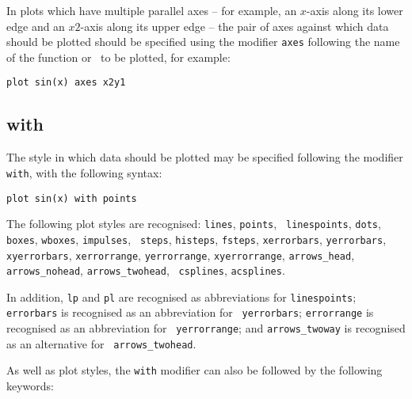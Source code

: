 In plots which have multiple parallel axes -- for example, an $x$-axis along its
lower edge and an $x2$-axis along its upper edge -- the pair of axes against
which data should be plotted should be specified using the modifier {\tt axes}
following the name of the function or \datafile\ to be plotted, for example:

\begin{verbatim}
plot sin(x) axes x2y1
\end{verbatim}

\subsection{with}

The style in which data should be plotted may be specified following the
modifier {\tt with}, with the following syntax:

\begin{verbatim}
plot sin(x) with points
\end{verbatim}

\label{sec:list_of_plotstyles}
The following plot styles are recognised: {\tt lines}, {\tt points}, {\tt
linespoints}, {\tt dots}, {\tt boxes}, {\tt wboxes}, {\tt impulses}, {\tt
steps}, {\tt histeps}, {\tt fsteps}, {\tt xerrorbars}, {\tt yerrorbars}, {\tt
xyerrorbars}, {\tt xerrorrange}, {\tt yerrorrange}, {\tt xyerrorrange},
\newline\noindent %
{\tt arrows\_head}, {\tt arrows\_nohead}, {\tt arrows\_twohead}, {\tt
csplines}, {\tt acsplines}.

In addition, {\tt lp} and {\tt pl} are recognised as abbreviations
for {\tt linespoints}; {\tt errorbars} is recognised as an abbreviation for {\tt
yerrorbars}; {\tt errorrange} is recognised as an abbreviation for {\tt
yerrorrange}; and {\tt arrows\_twoway} is recognised as an alternative for {\tt
arrows\_twohead}.

As well as plot styles, the {\tt with} modifier can also be followed by the
following keywords:

